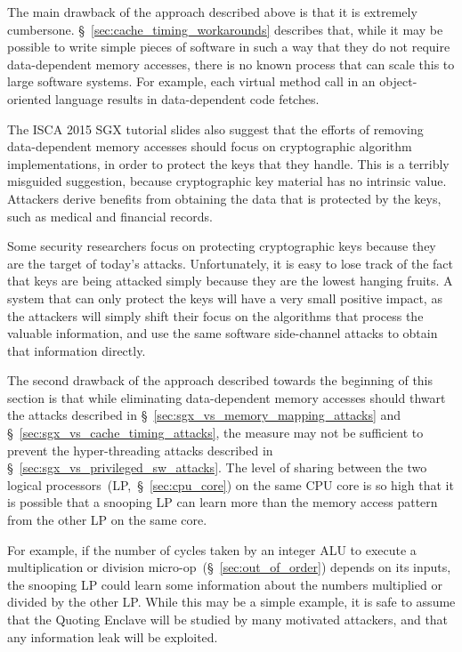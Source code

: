 The main drawback of the approach described above is that it is extremely
cumbersone. \S~\ref{sec:cache_timing_workarounds} describes that, while it may
be possible to write simple pieces of software in such a way that they do not
require data-dependent memory accesses, there is no known process that can
scale this to large software systems. For example, each virtual method call in
an object-oriented language results in data-dependent code fetches.

The ISCA 2015 SGX tutorial slides also suggest that the efforts of removing
data-dependent memory accesses should focus on cryptographic algorithm
implementations, in order to protect the keys that they handle. This is a
terribly misguided suggestion, because cryptographic key material has no
intrinsic value. Attackers derive benefits from obtaining the data that is
protected by the keys, such as medical and financial records.

Some security researchers focus on protecting cryptographic keys because they
are the target of today's attacks. Unfortunately, it is easy to lose track of
the fact that keys are being attacked simply because they are the lowest
hanging fruits. A system that can only protect the keys will have a very small
positive impact, as the attackers will simply shift their focus on the
algorithms that process the valuable information, and use the same software
side-channel attacks to obtain that information directly.

The second drawback of the approach described towards the beginning of this
section is that while eliminating data-dependent memory accesses should
thwart the attacks described in \S~\ref{sec:sgx_vs_memory_mapping_attacks} and
\S~\ref{sec:sgx_vs_cache_timing_attacks}, the measure may not be sufficient to
prevent the hyper-threading attacks described in
\S~\ref{sec:sgx_vs_privileged_sw_attacks}. The level of sharing between the two
logical processors~(LP,~\S~\ref{sec:cpu_core}) on the same CPU core is so high
that it is possible that a snooping LP can learn more than the memory access
pattern from the other LP on the same core.

For example, if the number of cycles taken by an integer ALU to execute a
multiplication or division micro-op~(\S~\ref{sec:out_of_order}) depends on its
inputs, the snooping LP could learn some information about the numbers
multiplied or divided by the other LP. While this may be a simple example, it
is safe to assume that the Quoting Enclave will be studied by many motivated
attackers, and that any information leak will be exploited.


